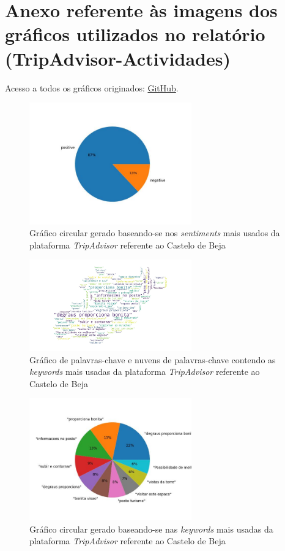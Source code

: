     \chapter{Anexo referente às imagens dos gráficos utilizados no relatório (TripAdvisor-Actividades)}
    
    Acesso a todos os gráficos originados: \href{https://github.com/CatKinKitKat/pi2021/tree/master/projecto/datascience/graphs/TripAdvisor/activities}{GitHub}.
    
    \label{an3}
    \begin{figure}[!htb]
    \centering
    \includegraphics[width=7cm]{figuras/TripAdvisor/Activities/place0_sentiments.jpeg}
    \caption{Gráfico circular gerado baseando-se nos \textit{sentiments} mais usados da plataforma \textit{TripAdvisor} referente ao Castelo de Beja}
    \label{fig:exemplofig}
    \end{figure}
    
    \begin{figure}[!htb]
    \centering
    \includegraphics[width=7cm]{figuras/TripAdvisor/Activities/place0_keywordcloud.jpeg}
    \caption{Gráfico de palavras-chave e nuvens de palavras-chave contendo as \textit{keywords} mais usadas da plataforma \textit{TripAdvisor} referente ao Castelo de Beja}
    \label{fig:exemplofig}
    \end{figure}
    
    \begin{figure}[!htb]
    \centering
    \includegraphics[width=7cm]{figuras/TripAdvisor/Activities/place0_keywords.jpeg}
    \caption{Gráfico circular gerado baseando-se nas \textit{keywords} mais usadas da plataforma \textit{TripAdvisor} referente ao Castelo de Beja}
    \label{fig:exemplofig}
    \end{figure}
    
